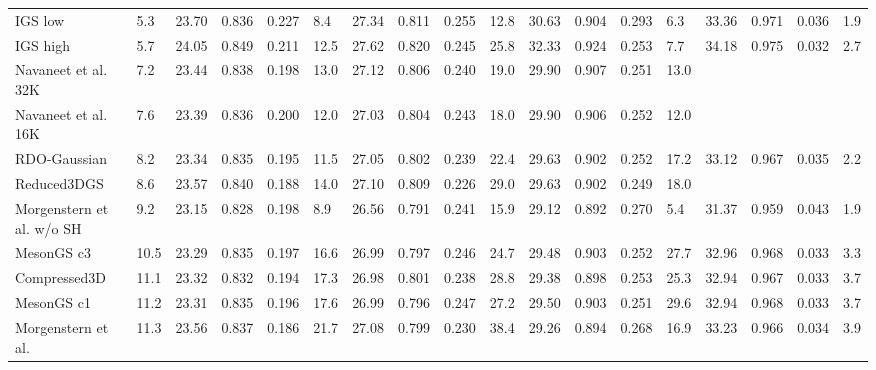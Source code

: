 {\begin{minipage}{\textheight}
\begin{adjustbox}{center}
\begin{tabular}{ll|llll|llll|llll|llll}
IGS low & 5.3 & 23.70 & 0.836 & 0.227 & \cellcolor{lightorange}8.4 & 27.34 & \cellcolor{lightorange}0.811 & 0.255 & \cellcolor{lightred}12.8 & \cellcolor{lightorange}30.63 & 0.904 & 0.293 & \cellcolor{lightyellow}6.3 & \cellcolor{lightyellow}33.36 & \cellcolor{lightorange}0.971 & 0.036 & \cellcolor{lightorange}1.9 \\
IGS high & 5.7 & \cellcolor{lightorange}24.05 & \cellcolor{lightyellow}0.849 & 0.211 & 12.5 & \cellcolor{lightorange}27.62 & \cellcolor{lightred}0.820 & 0.245 & 25.8 & \cellcolor{lightred}32.33 & \cellcolor{lightred}0.924 & 0.253 & 7.7 & \cellcolor{lightred}34.18 & \cellcolor{lightred}0.975 & \cellcolor{lightred}0.032 & 2.7 \\
Navaneet et al. 32K & 7.2 & 23.44 & 0.838 & 0.198 & 13.0 & 27.12 & 0.806 & 0.240 & 19.0 & 29.90 & \cellcolor{lightyellow}0.907 & \cellcolor{lightyellow}0.251 & 13.0 &  &  &  &  \\
Navaneet et al. 16K & 7.6 & 23.39 & 0.836 & 0.200 & 12.0 & 27.03 & 0.804 & 0.243 & 18.0 & 29.90 & 0.906 & 0.252 & 12.0 &  &  &  &  \\
RDO-Gaussian & 8.2 & 23.34 & 0.835 & 0.195 & 11.5 & 27.05 & 0.802 & 0.239 & 22.4 & 29.63 & 0.902 & 0.252 & 17.2 & 33.12 & 0.967 & 0.035 & \cellcolor{lightyellow}2.2 \\
Reduced3DGS & 8.6 & 23.57 & 0.840 & 0.188 & 14.0 & 27.10 & 0.809 & \cellcolor{lightred}0.226 & 29.0 & 29.63 & 0.902 & \cellcolor{lightred}0.249 & 18.0 &  &  &  &  \\
Morgenstern et al. w/o SH & 9.2 & 23.15 & 0.828 & 0.198 & \cellcolor{lightyellow}8.9 & 26.56 & 0.791 & 0.241 & \cellcolor{lightyellow}15.9 & 29.12 & 0.892 & 0.270 & \cellcolor{lightorange}5.4 & 31.37 & 0.959 & 0.043 & \cellcolor{lightorange}1.9 \\
MesonGS c3 & 10.5 & 23.29 & 0.835 & 0.197 & 16.6 & 26.99 & 0.797 & 0.246 & 24.7 & 29.48 & 0.903 & 0.252 & 27.7 & 32.96 & \cellcolor{lightyellow}0.968 & \cellcolor{lightorange}0.033 & 3.3 \\
Compressed3D & 11.1 & 23.32 & 0.832 & 0.194 & 17.3 & 26.98 & 0.801 & 0.238 & 28.8 & 29.38 & 0.898 & 0.253 & 25.3 & 32.94 & 0.967 & \cellcolor{lightorange}0.033 & 3.7 \\
MesonGS c1 & 11.2 & 23.31 & 0.835 & 0.196 & 17.6 & 26.99 & 0.796 & 0.247 & 27.2 & 29.50 & 0.903 & \cellcolor{lightyellow}0.251 & 29.6 & 32.94 & \cellcolor{lightyellow}0.968 & \cellcolor{lightorange}0.033 & 3.7 \\
Morgenstern et al. & 11.3 & 23.56 & 0.837 & \cellcolor{lightyellow}0.186 & 21.7 & 27.08 & 0.799 & \cellcolor{lightyellow}0.230 & 38.4 & 29.26 & 0.894 & 0.268 & 16.9 & 33.23 & 0.966 & \cellcolor{lightyellow}0.034 & 3.9 \\

\end{tabular}
\end{adjustbox}
\end{minipage}}

